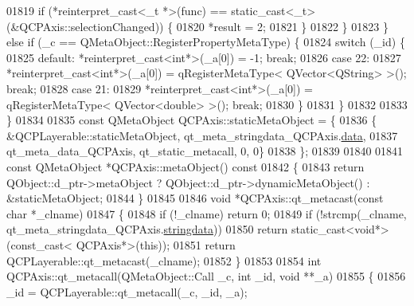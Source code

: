 \begin{DoxyCode}
01819             \textcolor{keywordflow}{if} (*reinterpret\_cast<\_t *>(func) == \textcolor{keyword}{static\_cast<}\_t\textcolor{keyword}{>}(&QCPAxis::selectionChanged)) \{
01820                 *result = 2;
01821             \}
01822         \}
01823     \} \textcolor{keywordflow}{else} \textcolor{keywordflow}{if} (\_c == QMetaObject::RegisterPropertyMetaType) \{
01824         \textcolor{keywordflow}{switch} (\_id) \{
01825         \textcolor{keywordflow}{default}: *\textcolor{keyword}{reinterpret\_cast<}\textcolor{keywordtype}{int}*\textcolor{keyword}{>}(\_a[0]) = -1; \textcolor{keywordflow}{break};
01826         \textcolor{keywordflow}{case} 22:
01827             *\textcolor{keyword}{reinterpret\_cast<}\textcolor{keywordtype}{int}*\textcolor{keyword}{>}(\_a[0]) = qRegisterMetaType< QVector<QString> >(); \textcolor{keywordflow}{break};
01828         \textcolor{keywordflow}{case} 21:
01829             *\textcolor{keyword}{reinterpret\_cast<}\textcolor{keywordtype}{int}*\textcolor{keyword}{>}(\_a[0]) = qRegisterMetaType< QVector<double> >(); \textcolor{keywordflow}{break};
01830         \}
01831     \}
01832 
01833 \}
01834 
01835 \textcolor{keyword}{const} QMetaObject QCPAxis::staticMetaObject = \{
01836     \{ &QCPLayerable::staticMetaObject, qt\_meta\_stringdata\_QCPAxis.\hyperlink{a00016_a6de5289a2e23a98b0352a48533dedbd4}{data},
01837       qt\_meta\_data\_QCPAxis,  qt\_static\_metacall, 0, 0\}
01838 \};
01839 
01840 
01841 \textcolor{keyword}{const} QMetaObject *QCPAxis::metaObject()\textcolor{keyword}{ const}
01842 \textcolor{keyword}{}\{
01843     \textcolor{keywordflow}{return} QObject::d\_ptr->metaObject ? QObject::d\_ptr->dynamicMetaObject() : &staticMetaObject;
01844 \}
01845 
01846 \textcolor{keywordtype}{void} *QCPAxis::qt\_metacast(\textcolor{keyword}{const} \textcolor{keywordtype}{char} *\_clname)
01847 \{
01848     \textcolor{keywordflow}{if} (!\_clname) \textcolor{keywordflow}{return} 0;
01849     \textcolor{keywordflow}{if} (!strcmp(\_clname, qt\_meta\_stringdata\_QCPAxis.\hyperlink{a00016_a1fe440f64883a266431cf43cff1b5052}{stringdata}))
01850         \textcolor{keywordflow}{return} \textcolor{keyword}{static\_cast<}\textcolor{keywordtype}{void}*\textcolor{keyword}{>}(\textcolor{keyword}{const\_cast<} QCPAxis*\textcolor{keyword}{>}(\textcolor{keyword}{this}));
01851     \textcolor{keywordflow}{return} QCPLayerable::qt\_metacast(\_clname);
01852 \}
01853 
01854 \textcolor{keywordtype}{int} QCPAxis::qt\_metacall(QMetaObject::Call \_c, \textcolor{keywordtype}{int} \_id, \textcolor{keywordtype}{void} **\_a)
01855 \{
01856     \_id = QCPLayerable::qt\_metacall(\_c, \_id, \_a);

\end{DoxyCode}
